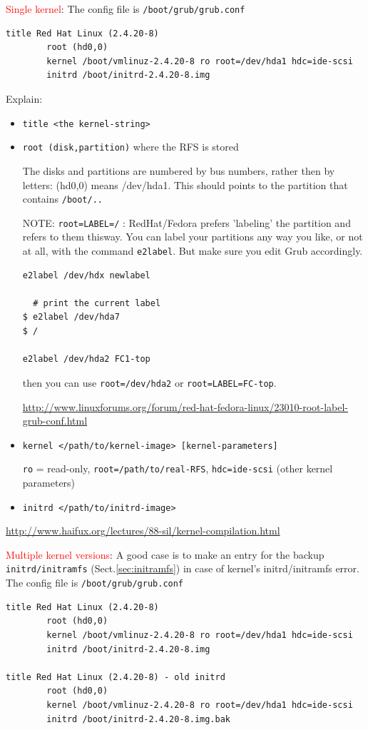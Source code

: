 \textcolor{red}{Single kernel}: The config file is \verb!/boot/grub/grub.conf! 
\begin{verbatim}
title Red Hat Linux (2.4.20-8)
        root (hd0,0)
        kernel /boot/vmlinuz-2.4.20-8 ro root=/dev/hda1 hdc=ide-scsi
        initrd /boot/initrd-2.4.20-8.img
\end{verbatim}
Explain:
\begin{itemize}
  \item \verb!title <the kernel-string>!
  
  \item \verb!root (disk,partition)! where the RFS is stored
  
  The disks and partitions are numbered by bus numbers, rather then by letters:
  (hd0,0) means /dev/hda1.
  This should points to the partition that contains \verb!/boot/..!
  
  NOTE: \verb!root=LABEL=/! : RedHat/Fedora prefers 'labeling' the partition
  and refers to them thisway.  You can label your partitions any way you like,
  or not at all, with the command \verb!e2label!. But make sure you edit Grub
  accordingly.
\begin{verbatim}
e2label /dev/hdx newlabel

  # print the current label
$ e2label /dev/hda7
$ /

e2label /dev/hda2 FC1-top
\end{verbatim}  
then you can use \verb!root=/dev/hda2! or \verb!root=LABEL=FC-top!.

\url{http://www.linuxforums.org/forum/red-hat-fedora-linux/23010-root-label-grub-conf.html}

  \item \verb!kernel </path/to/kernel-image> [kernel-parameters]!
  
  \verb!ro! = read-only,
  \verb!root=/path/to/real-RFS!,
  \verb!hdc=ide-scsi! (other kernel parameters)
  
  \item \verb!initrd </path/to/initrd-image>!
\end{itemize}
\url{http://www.haifux.org/lectures/88-sil/kernel-compilation.html}

\textcolor{red}{Multiple kernel versions}: A good case is to make an entry for
the backup \verb!initrd/initramfs! (Sect.\ref{sec:initramfs}) in case of kernel's
initrd/initramfs error.
The config file is \verb!/boot/grub/grub.conf!

\begin{verbatim}
title Red Hat Linux (2.4.20-8)
        root (hd0,0)
        kernel /boot/vmlinuz-2.4.20-8 ro root=/dev/hda1 hdc=ide-scsi
        initrd /boot/initrd-2.4.20-8.img

title Red Hat Linux (2.4.20-8) - old initrd
        root (hd0,0)
        kernel /boot/vmlinuz-2.4.20-8 ro root=/dev/hda1 hdc=ide-scsi
        initrd /boot/initrd-2.4.20-8.img.bak

\end{verbatim}


